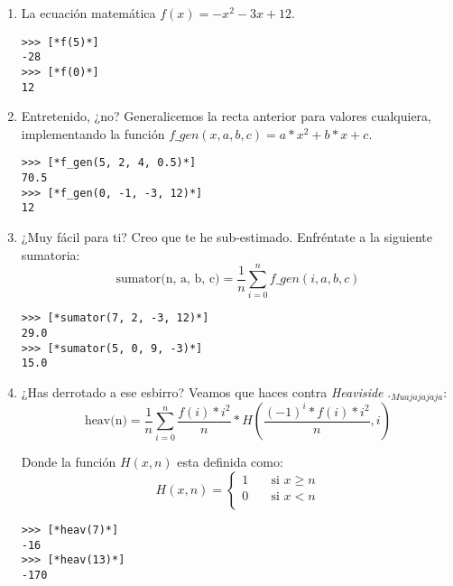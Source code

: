 \begin{enumerate}
    \item La ecuación matemática $f(x) = -x^{2} - 3x + 12$.
    \begin{lstlisting}[style=consola]
>>> [*f(5)*]
-28
>>> [*f(0)*]
12
    \end{lstlisting}
    
    \item Entretenido, ¿no? Generalicemos la recta anterior para valores cualquiera, implementando la función $f\_gen(x, a, b, c) = a*x^2 + b*x + c$.
    \begin{lstlisting}[style=consola]
>>> [*f_gen(5, 2, 4, 0.5)*]
70.5
>>> [*f_gen(0, -1, -3, 12)*]
12
    \end{lstlisting}

    \item ¿Muy fácil para ti? Creo que te he sub-estimado. Enfréntate a la siguiente sumatoria:
    \begin{equation*}
        \text{sumator(n, a, b, c)} = \frac{1}{n}\sum_{i=0}^{n}{f\_gen(i, a, b, c)}
    \end{equation*}
    \begin{lstlisting}[style=consola]
>>> [*sumator(7, 2, -3, 12)*]
29.0
>>> [*sumator(5, 0, 9, -3)*]
15.0
    \end{lstlisting}
    
    \item ¿Has derrotado a ese esbirro? Veamos que haces contra \textit{Heaviside} $._{Muajajajaja}$:
    \begin{equation*}
        \text{heav(n)} = \frac{1}{n}\sum_{i=0}^{n}\frac{f(i)*i^2}{n}*H\left(\frac{(-1)^i * f(i)*i^2}{n}, i\right)
    \end{equation*}
    
    Donde la función $H(x, n)$ esta definida como:
    \begin{equation*}
        H(x, n) = 
        \begin{cases}
        1 & \quad\text{si } x \geq n \\
        0 & \quad\text{si } x < n \\
     \end{cases}
    \end{equation*}

    \begin{lstlisting}[style=consola]
>>> [*heav(7)*]
-16
>>> [*heav(13)*]
-170
    \end{lstlisting}
    
        \begin{comment}
    

\end{comment}
\end{enumerate}
